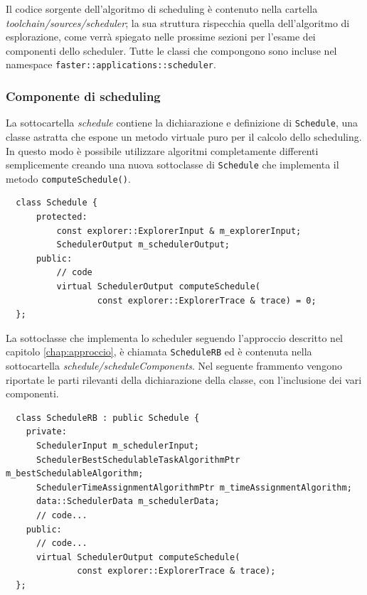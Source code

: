Il codice sorgente dell'algoritmo di scheduling è contenuto nella cartella 
\emph{toolchain/sources/scheduler}; la sua struttura rispecchia quella 
dell'algoritmo di esplorazione, come verrà spiegato nelle prossime sezioni per 
l'esame dei componenti dello scheduler. Tutte le classi che compongono 
sono incluse nel namespace \verb+faster::applications::scheduler+.

\subsubsection{Componente di scheduling}
La sottocartella \emph{schedule} contiene la dichiarazione e definizione di
\verb+Schedule+, una classe astratta che espone un metodo virtuale puro per il 
calcolo dello scheduling. In questo modo è possibile utilizzare algoritmi 
completamente differenti semplicemente creando una nuova sottoclasse di 
\verb+Schedule+ che implementa il metodo \verb+computeSchedule()+.
\newline
\begin{verbatim}
  class Schedule {
      protected:
          const explorer::ExplorerInput & m_explorerInput;
          SchedulerOutput m_schedulerOutput;
      public:
          // code
          virtual SchedulerOutput computeSchedule(
                  const explorer::ExplorerTrace & trace) = 0;
  };
\end{verbatim}

La sottoclasse che implementa lo scheduler seguendo l'approccio descritto nel capitolo 
\ref{chap:approccio}, è chiamata \verb+ScheduleRB+ ed è contenuta nella 
sottocartella \emph{schedule/scheduleComponents}. Nel seguente frammento 
vengono riportate le parti rilevanti della dichiarazione della classe, con 
l'inclusione dei vari componenti.
\newline
\begin{verbatim}
  class ScheduleRB : public Schedule {
    private:
      SchedulerInput m_schedulerInput;
      SchedulerBestSchedulableTaskAlgorithmPtr m_bestSchedulableAlgorithm;
      SchedulerTimeAssignmentAlgorithmPtr m_timeAssignmentAlgorithm;
      data::SchedulerData m_schedulerData;
      // code...
    public:
      // code...
      virtual SchedulerOutput computeSchedule(
              const explorer::ExplorerTrace & trace);
  };
\end{verbatim}

